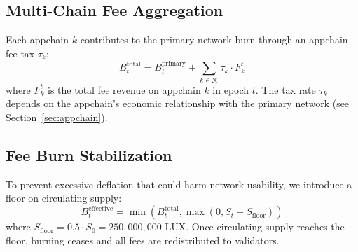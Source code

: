 \subsection{Multi-Chain Fee Aggregation}

Each appchain $k$ contributes to the primary network burn through an appchain fee tax $\tau_k$:
\begin{equation}
    B_t^{\text{total}} = B_t^{\text{primary}} + \sum_{k \in \mathcal{K}} \tau_k \cdot F_k^t
\end{equation}
where $F_k^t$ is the total fee revenue on appchain $k$ in epoch $t$. The tax rate $\tau_k$ depends on the appchain's economic relationship with the primary network (see Section~\ref{sec:appchain}).

\subsection{Fee Burn Stabilization}

To prevent excessive deflation that could harm network usability, we introduce a floor on circulating supply:
\begin{equation}
    B_t^{\text{effective}} = \min\left(B_t^{\text{total}}, \max\left(0, S_t - S_{\text{floor}}\right)\right)
\end{equation}
where $S_{\text{floor}} = 0.5 \cdot S_0 = 250{,}000{,}000$ LUX. Once circulating supply reaches the floor, burning ceases and all fees are redistributed to validators.


